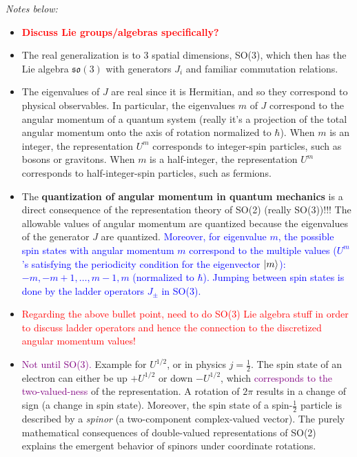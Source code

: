 \textit{Notes below:}
    \begin{itemize}
        \item \textcolor{red}{\textbf{Discuss Lie groups/algebras specifically?}}
        \item The real generalization is to 3 spatial dimensions, SO(3), which then has the Lie algebra $\mathfrak{so}(3)$ with generators $J_i$ and familiar commutation relations.
        \item The eigenvalues of $J$ are real since it is Hermitian, and so they correspond to physical observables. In particular, the eigenvalues $m$ of $J$ correspond to the angular momentum of a quantum system (really it's a projection of the total angular momentum onto the axis of rotation normalized to $\hbar$). When $m$ is an integer, the representation $U^m$ corresponds to integer-spin particles, such as bosons or gravitons. When $m$ is a half-integer, the representation $U^m$ corresponds to half-integer-spin particles, such as fermions.
        \item The \textbf{quantization of angular momentum in quantum mechanics} is a direct consequence of the representation theory of SO(2) (really SO(3))!!! The allowable values of angular momentum are quantized because the eigenvalues of the generator $J$ are quantized. \textcolor{blue}{Moreover, for eigenvalue $m$, the possible spin states with angular momentum $m$ correspond to the multiple values ($U^m$'s satisfying the periodicity condition for the eigenvector $\ket{m}$): $-m, -m+1, \dots, m-1, m$ (normalized to $\hbar$). Jumping between spin states is done by the ladder operators $J_\pm$ in SO(3).}
        \item \textcolor{red}{Regarding the above bullet point, need to do SO(3) Lie algebra stuff in order to discuss ladder operators and hence the connection to the discretized angular momentum values!}
        \item \textcolor{purple}{Not until SO(3).} Example for $U^{1/2}$, or in physics $j=\frac{1}{2}$. The spin state of an electron can either be up $+U^{1/2}$ or down $-U^{1/2}$, which \textcolor{purple}{corresponds to the two-valued-ness} of the representation. A rotation of $2\pi$ results in a change of sign (a change in spin state). Moreover, the spin state of a spin-$\frac{1}{2}$ particle is described by a \textit{spinor} (a two-component complex-valued vector). The purely mathematical consequences of double-valued representations of SO(2) explains the emergent behavior of spinors under coordinate rotations.
    \end{itemize}

